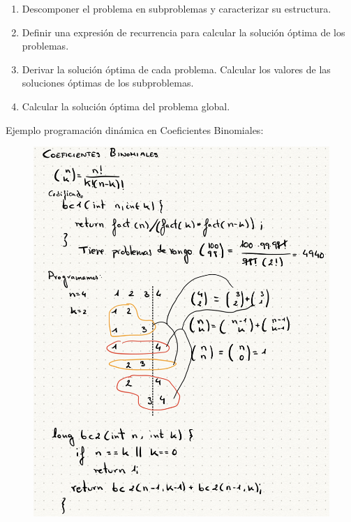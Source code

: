 \documentclass[12pt, twoside, openright]{report} %
\begin{document}
    \begin{enumerate}  
    \item
      Descomponer el problema en subproblemas y caracterizar su
      estructura.
    \item
      Definir una expresión de recurrencia para calcular la solución
      óptima de los problemas.
    \item
      Derivar la solución óptima de cada problema. Calcular los valores
      de las soluciones óptimas de los subproblemas.
    \item
      Calcular la solución óptima del problema global.
    \end{enumerate}
\pagebreak
  Ejemplo programación dinámica en Coeficientes Binomiales:
  \begin{figure}[H]
	{\includegraphics[scale=.32]{Untitled 23.png}}
\end{figure}
\end{document}
